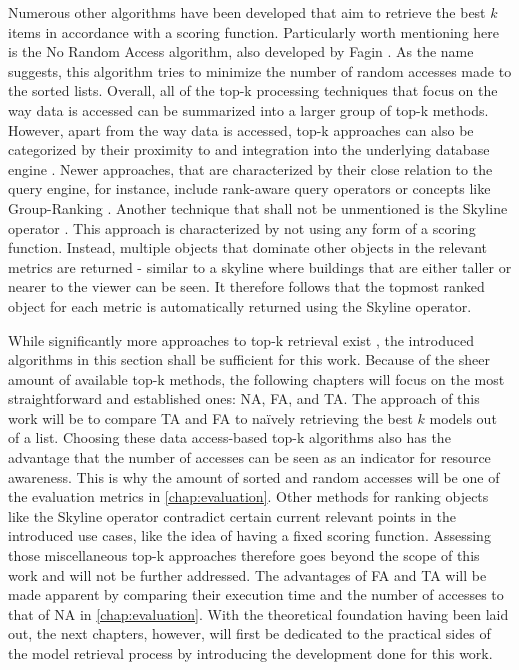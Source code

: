 Numerous other algorithms have been developed that aim to retrieve the best $k$ items in accordance with a scoring function. Particularly worth mentioning here is the No Random Access algorithm, also developed by Fagin \cite{fagin2002a}. As the name suggests, this algorithm tries to minimize the number of random accesses made to the sorted lists. Overall, all of the top-k processing techniques that focus on the way data is accessed can be summarized into a larger group of top-k methods. However, apart from the way data is accessed, top-k approaches can also be categorized by their proximity to and integration into the underlying database engine \cite{ilyas2008}. Newer approaches, that are characterized by their close relation to the query engine, for instance, include rank-aware query operators or concepts like Group-Ranking \cite{li2006}. Another technique that shall not be unmentioned is the Skyline operator \cite{borzsony2001}. This approach is characterized by not using any form of a scoring function. Instead, multiple objects that dominate other objects in the relevant metrics are returned - similar to a skyline where buildings that are either taller or nearer to the viewer can be seen. It therefore follows that the topmost ranked object for each metric is automatically returned using the Skyline operator. 

While significantly more approaches to top-k retrieval exist \cite{ilyas2008}, the introduced algorithms in this section shall be sufficient for this work. Because of the sheer amount of available top-k methods, the following chapters will focus on the most straightforward and established ones: NA, FA, and TA. The approach of this work will be to compare TA and FA to naïvely retrieving the best $k$ models out of a list. Choosing these data access-based top-k algorithms also has the advantage that the number of accesses can be seen as an indicator for resource awareness. This is why the amount of sorted and random accesses will be one of the evaluation metrics in \autoref{chap:evaluation}. Other methods for ranking objects like the Skyline operator contradict certain current relevant points in the introduced use cases, like the idea of having a fixed scoring function. Assessing those miscellaneous top-k approaches therefore goes beyond the scope of this work and will not be further addressed. The advantages of FA and TA will be made apparent by comparing their execution time and the number of accesses to that of NA in \autoref{chap:evaluation}.
With the theoretical foundation having been laid out, the next chapters, however, will first be dedicated to the practical sides of the model retrieval process by introducing the development done for this work.